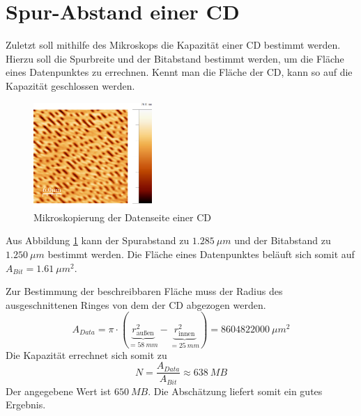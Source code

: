     \section{Spur-Abstand einer CD}

Zuletzt soll mithilfe des Mikroskops die Kapazität einer CD bestimmt werden. Hierzu
soll die Spurbreite und der Bitabstand bestimmt werden, um die Fläche eines 
Datenpunktes zu errechnen. Kennt man die Fläche der CD, kann so auf die Kapazität 
geschlossen werden. \par
\begin{figure}[h]
    \centering
    \includegraphics[width=0.4\textwidth]{Mess/cd_paint.png}
    \caption{Mikroskopierung der Datenseite einer CD}
    \label{cd}
\end{figure}
Aus Abbildung \ref{cd} kann der Spurabstand zu $\SI{1,285}{\mu m}$ und der 
Bitabstand zu $\SI{1,250}{\mu m}$ bestimmt werden. Die Fläche eines Datenpunktes
beläuft sich somit auf $A_{Bit} = \SI{1,61}{\mu m^2}$. \par
Zur Bestimmung der beschreibbaren Fläche muss der Radius des ausgeschnittenen
Ringes von dem der CD abgezogen werden. 
\[
    A_{Data} = \pi \cdot \left( \underset{=\SI{58}{mm}}{\underbrace{r_{\text{außen}}^2}}
    - \underset{=\SI{25}{mm}}{\underbrace{r_{\text{innen}}^2 }} \right)
    = \SI{8604822000}{\mu m^2}
\]
Die Kapazität errechnet sich somit zu
\[
    N = \frac{A_{Data}}{A_{Bit}} \approx \SI{638}{MB}
\]
Der angegebene Wert ist $\SI{650}{MB}$. Die Abschätzung liefert somit ein gutes Ergebnis.

